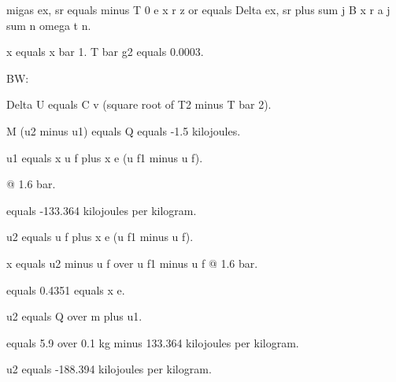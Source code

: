 migas ex, sr equals minus T 0 e x r z or equals Delta ex, sr plus sum j B x r a j sum n omega t n.

x equals x bar 1. T bar g2 equals 0.0003.

BW:

Delta U equals C v (square root of T2 minus T bar 2).

M (u2 minus u1) equals Q equals -1.5 kilojoules.

u1 equals x u f plus x e (u f1 minus u f).

@ 1.6 bar.

equals -133.364 kilojoules per kilogram.

u2 equals u f plus x e (u f1 minus u f).

x equals u2 minus u f over u f1 minus u f @ 1.6 bar.

equals 0.4351 equals x e.

u2 equals Q over m plus u1.

equals 5.9 over 0.1 kg minus 133.364 kilojoules per kilogram.

u2 equals -188.394 kilojoules per kilogram.